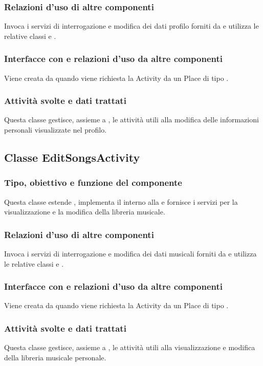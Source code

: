 \subsubsection*{Relazioni d'uso di altre componenti}
Invoca i servizi di interrogazione e modifica dei dati profilo forniti da
 e utilizza le relative classi  e
.
\subsubsection*{Interfacce con e relazioni d'uso da altre componenti}
Viene creata da  quando viene richiesta la Activity da
un Place di tipo .
\subsubsection*{Attivit\`a svolte e dati trattati}
Questa classe gestisce, assieme a , le attivit\`a utili alla
modifica delle informazioni personali visualizzate nel profilo.

\subsection{Classe EditSongsActivity}
\subsubsection*{Tipo, obiettivo e funzione del componente}
Questa classe estende , implementa il 
interno alla  e fornisce i servizi per la visualizzazione e la
modifica della libreria musicale.
\subsubsection*{Relazioni d'uso di altre componenti} Invoca i servizi di
interrogazione e modifica dei dati musicali forniti da  e
utilizza le relative classi  e .
\subsubsection*{Interfacce con e relazioni d'uso da altre componenti}
Viene creata da  quando viene richiesta la Activity da
un Place di tipo .
\subsubsection*{Attivit\`a svolte e dati trattati}
Questa classe gestisce, assieme a , le attivit\`a utili alla
visualizzazione e modifica della libreria musicale personale.

